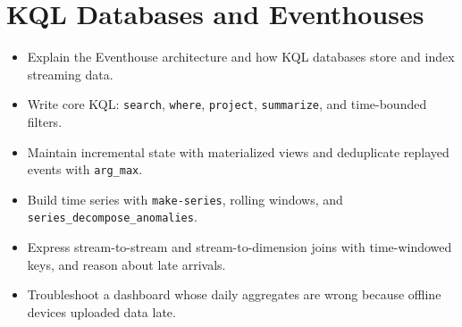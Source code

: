 \chapter{KQL Databases and Eventhouses}
%

\begin{objectives}
\begin{itemize}
    \item Explain the Eventhouse architecture and how KQL databases store and index streaming data.
    \item Write core KQL: \texttt{search}, \texttt{where}, \texttt{project}, \texttt{summarize}, and time-bounded filters.
    \item Maintain incremental state with materialized views and deduplicate replayed events with \texttt{arg\_max}.
    \item Build time series with \texttt{make-series}, rolling windows, and \texttt{series\_decompose\_anomalies}.
    \item Express stream-to-stream and stream-to-dimension joins with time-windowed keys, and reason about late arrivals.
    \item Troubleshoot a dashboard whose daily aggregates are wrong because offline devices uploaded data late.
\end{itemize}
\end{objectives}

